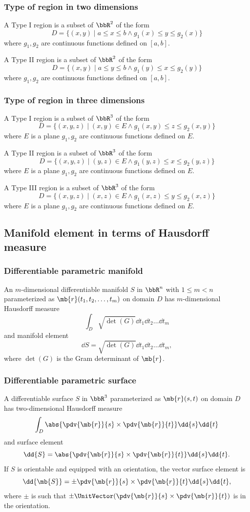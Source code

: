 \documentclass[a4paper,12pt]{report}
\begin{document}
\begin{itemize}
\begin{itemize}
\subsubsection{Type of region in two dimensions}
A Type I region is a subset of $\bbR^2$ of the form
\[D=\{(x,y)\mid a\le x\le b\land g_1(x)\le y\le g_2(x)\}\]
where $g_1,g_2$ are continuous functions defined on $[a,b]$.

A Type II region is a subset of $\bbR^2$ of the form
\[D=\{(x,y)\mid a\le y\le b\land g_1(y)\le x\le g_2(y)\}\]
where $g_1,g_2$ are continuous functions defined on $[a,b]$.
\subsubsection{Type of region in three dimensions}
A Type I region is a subset of $\bbR^3$ of the form
\[D=\{(x,y,z)\mid (x,y)\in E\land g_1(x,y)\le z\le g_2(x,y)\}\]
where $E$ is a plane $g_1,g_2$ are continuous functions defined on $E$.

A Type II region is a subset of $\bbR^3$ of the form
\[D=\{(x,y,z)\mid (y,z)\in E\land g_1(y,z)\le x\le g_2(y,z)\}\]
where $E$ is a plane $g_1,g_2$ are continuous functions defined on $E$.

A Type III region is a subset of $\bbR^3$ of the form
\[D=\{(x,y,z)\mid (x,z)\in E\land g_1(x,z)\le y\le g_2(x,z)\}\]
where $E$ is a plane $g_1,g_2$ are continuous functions defined on $E$.
\subsection{Manifold element in terms of Hausdorff measure}
\subsubsection{Differentiable parametric manifold}
An $m$-dimensional differentiable manifold $S$ in $\bbR^n$ with $1\le m<n$ parameterized as $\mb{r}(t_1,t_2,\ldots,t_m)$ on domain $D$ has $m$-dimensional Hausdorff measure
\[\int_D\sqrt{\det(G)}\dd{t_1}\dd{t_2}\ldots\dd{t_m}\]
and manifold element
\[\dd{S}=\sqrt{\det(G)}\dd{t_1}\dd{t_2}\ldots\dd{t_m},\]
where $\det(G)$ is the Gram determinant of $\mb{r}$.
\subsubsection{Differentiable parametric surface}
A differentiable surface $S$ in $\bbR^3$ parameterized as $\mb{r}(s,t)$ on domain $D$ has two-dimensional Hausdorff measure
\[\int_D\abs{\pdv{\mb{r}}{s}\times\pdv{\mb{r}}{t}}\dd{s}\dd{t}\]
and surface element
\[\dd{S}=\abs{\pdv{\mb{r}}{s}\times\pdv{\mb{r}}{t}}\dd{s}\dd{t}.\]
If $S$ is orientable and equipped with an orientation, the vector surface element is
\[\dd{\mb{S}}=\pm\pdv{\mb{r}}{s}\times\pdv{\mb{r}}{t}\dd{s}\dd{t},\]
where $\pm$ is such that $\pm\UnitVector(\pdv{\mb{r}}{s}\times\pdv{\mb{r}}{t})$ is in the orientation.

\end{itemize}
\end{itemize}
\end{document}
